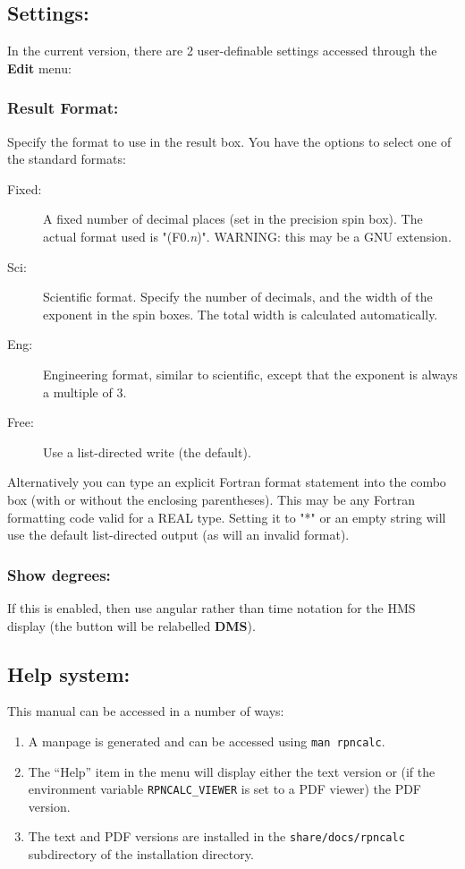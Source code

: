 \documentclass{article}
\begin{document}
  \subsection{Settings:}

  In the current version, there are 2 user-definable settings accessed
  through the \textbf{Edit} menu:

  \subsubsection{Result Format:}
  Specify the format to use in the result box. You have the options to
  select one of the standard formats:
  \begin{description}
  \item [Fixed:] A fixed number of decimal places (set in the precision
    spin box). The actual format used is "(F0.\emph{n})". WARNING: this
    may be a GNU extension.
  \item[Sci:] Scientific format. Specify the number of decimals, and
    the width of the exponent in the spin boxes. The total width is
    calculated automatically.
  \item[Eng:] Engineering format, similar to scientific, except that
    the exponent is always a multiple of 3.
  \item[Free:] Use a list-directed write (the default).
  \end{description}
  Alternatively you can type an explicit Fortran format statement into
  the combo box (with or without the enclosing parentheses). This may
  be any Fortran formatting code valid for a REAL type. Setting it to
  "*" or an empty string will use the default list-directed output (as
  will an invalid format).

  \subsubsection{Show degrees:}
  If this is enabled, then use angular rather than time notation for the
  HMS display (the button will be relabelled \textbf{DMS}).

\subsection{Help system:}

This manual can be accessed in a number of ways:
\begin{enumerate}
\item A manpage is generated and can be accessed using 
\texttt{man rpncalc}.
\item The ``Help'' item in the menu will display either the text
  version or (if the environment variable \texttt{RPNCALC\_VIEWER} is
  set to a PDF viewer) the PDF version.
\item The text and PDF versions are installed in the
  \texttt{share/docs/rpncalc} subdirectory of the installation directory.
\end{enumerate}
\end{document}
